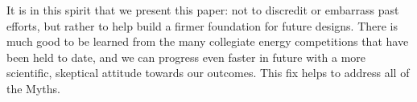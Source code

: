 \documentclass[jou]{apa} %
\begin{document}
It is in this spirit that we present this paper: not to discredit or embarrass past
efforts, but rather to help build a firmer foundation for future designs.  There is much
good to be learned from the many collegiate energy competitions that have been held to
date, and we can progress even faster in future with a more scientific, skeptical attitude
towards our outcomes.  This fix helps to address all of the Myths.









\end{document}
